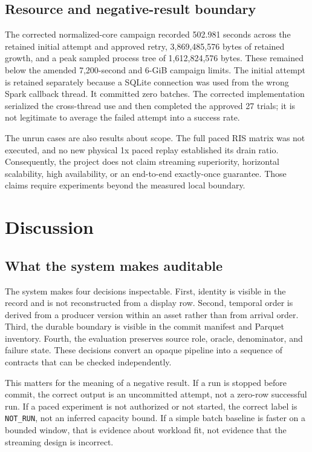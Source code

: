\documentclass[a4paper,11pt]{article}
\begin{document}
\subsection{Resource and negative-result boundary}
The corrected normalized-core campaign recorded 502.981 seconds across the retained initial attempt and approved retry, 3,869,485,576 bytes of retained growth, and a peak sampled process tree of 1,612,824,576 bytes. These remained below the amended 7,200-second and 6-GiB campaign limits. The initial attempt is retained separately because a SQLite connection was used from the wrong Spark callback thread. It committed zero batches. The corrected implementation serialized the cross-thread use and then completed the approved 27 trials; it is not legitimate to average the failed attempt into a success rate.

The unrun cases are also results about scope. The full paced RIS matrix was not executed, and no new physical 1x paced replay established its drain ratio. Consequently, the project does not claim streaming superiority, horizontal scalability, high availability, or an end-to-end exactly-once guarantee. Those claims require experiments beyond the measured local boundary.
\section{Discussion}
\subsection{What the system makes auditable}
The system makes four decisions inspectable. First, identity is visible in the record and is not reconstructed from a display row. Second, temporal order is derived from a producer version within an asset rather than from arrival order. Third, the durable boundary is visible in the commit manifest and Parquet inventory. Fourth, the evaluation preserves source role, oracle, denominator, and failure state. These decisions convert an opaque pipeline into a sequence of contracts that can be checked independently.

This matters for the meaning of a negative result. If a run is stopped before commit, the correct output is an uncommitted attempt, not a zero-row successful run. If a paced experiment is not authorized or not started, the correct label is \texttt{NOT\_RUN}, not an inferred capacity bound. If a simple batch baseline is faster on a bounded window, that is evidence about workload fit, not evidence that the streaming design is incorrect.
\end{document}

